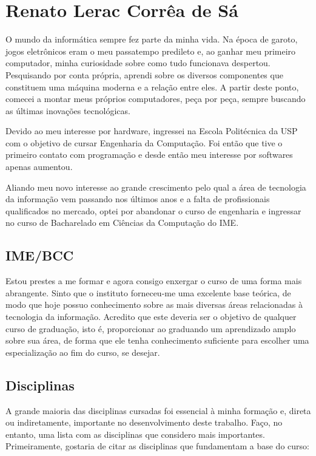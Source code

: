 \newpage
\section{Renato Lerac Corrêa de Sá}
\label{sec:renato_subjetiva}

O mundo da informática sempre fez parte da minha vida. Na época de garoto, jogos eletrônicos eram o
meu passatempo predileto e, ao ganhar meu primeiro computador, minha curiosidade sobre como tudo
funcionava despertou. Pesquisando por conta própria, aprendi sobre os diversos componentes que
constituem uma máquina moderna e a relação entre eles. A partir deste ponto, comecei a montar meus
próprios computadores, peça por peça, sempre buscando as últimas inovações tecnológicas.

Devido ao meu interesse por hardware, ingressei na Escola Politécnica da USP com o objetivo de
cursar Engenharia da Computação. Foi então que tive o primeiro contato com programação e desde então
meu interesse por softwares apenas aumentou.

Aliando meu novo interesse ao grande crescimento pelo qual a área de tecnologia da informação
vem passando nos últimos anos e a falta de profissionais qualificados no mercado, optei por
abandonar o curso de engenharia e ingressar no curso de Bacharelado em Ciências da Computação do
IME.

\subsection{IME/BCC}

Estou prestes a me formar e agora consigo enxergar o curso de uma forma mais abrangente. Sinto que o
instituto forneceu-me uma excelente base teórica, de modo que hoje possuo conhecimento sobre as mais
diversas áreas relacionadas à tecnologia da informação. Acredito que este deveria ser o objetivo de
qualquer curso de graduação, isto é, proporcionar ao graduando um aprendizado amplo sobre sua área,
de forma que ele tenha conhecimento suficiente para escolher uma especialização ao fim do curso, se
desejar.

\subsection{Disciplinas}

A grande maioria das disciplinas cursadas foi essencial à minha formação e, direta ou
indiretamente, importante no desenvolvimento deste trabalho. Faço, no entanto, uma lista
com as disciplinas que considero mais importantes. Primeiramente, gostaria de citar as disciplinas
que fundamentam a base do curso:

